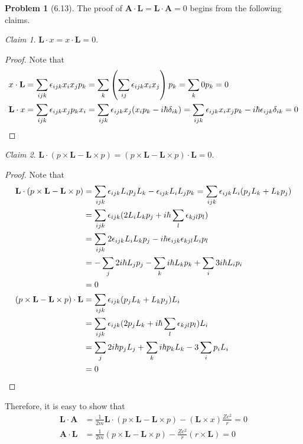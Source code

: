 \documentclass[twoside,11pt]{article}
\theoremstyle{definition}
\newtheorem{problem}{Problem}
\theoremstyle{remark}
\newtheorem*{claim}{Claim}
\begin{document}
\begin{problem}[6.13]
The proof of $\mathbf{A}\cdot\mathbf{L} = \mathbf{L}\cdot\mathbf{A}=0$
begins from the following claims.
\begin{claim}
    $\mathbf{L}\cdot x = x\cdot \mathbf{L} = 0$.
\end{claim}
\begin{proof}
    Note that
    \begin{align*}
        x\cdot\mathbf{L} &= \sum_{ijk}\epsilon_{ijk}x_ix_jp_k = \sum_k \left(\sum_{ij}\epsilon_{ijk}x_ix_j\right)p_k
        = \sum_k 0p_k = 0\\
        \mathbf{L}\cdot x &= \sum_{ijk}\epsilon_{ijk}x_jp_kx_i = 
        \sum_{ijk}\epsilon_{ijk}x_j(x_ip_k-i\hbar\delta_{ik}) =
        \sum_{ijk}\epsilon_{ijk} x_ix_jp_k-i\hbar\epsilon_{ijk}\delta_{ik} = 0
        \qedhere
    \end{align*}
\end{proof}
\begin{claim}
    $\mathbf{L}\cdot (p\times\mathbf{L} - \mathbf{L}\times p) = 
    (p\times \mathbf{L} - \mathbf{L}\times p)\cdot \mathbf{L} = 0$.
\end{claim}
\begin{proof}
    Note that
    \begin{align*}
        \mathbf{L}\cdot (p\times\mathbf{L} - \mathbf{L}\times p) &= 
        \sum_{ijk}\epsilon_{ijk}L_ip_jL_k - \epsilon_{ijk}L_iL_jp_k
        =\sum_{ijk}\epsilon_{ijk}L_i(p_jL_k + L_kp_j)\\
        &= \sum_{ijk}\epsilon_{ijk}(2L_iL_kp_j + i\hbar\sum_{l}\epsilon_{kjl}p_l)\\
        &= \sum_{ijk}2\epsilon_{ijk}L_iL_kp_j - i\hbar\epsilon_{ijk}\epsilon_{kjl}L_ip_l\\
        &= -\sum_j 2i\hbar L_jp_j - \sum_ki\hbar L_kp_k + \sum_i 3i\hbar L_ip_i\\
        &= 0\\
        (p\times\mathbf{L} - \mathbf{L}\times p)\cdot\mathbf{L} &=
        \sum_{ijk}\epsilon_{ijk}(p_jL_k+L_kp_j)L_i\\
        &= \sum_{ijk}\epsilon_{ijk}(2p_jL_k + i\hbar\sum_l\epsilon_{kjl}p_l)L_i\\
        &= \sum_j 2i\hbar p_j L_j + \sum_ki\hbar p_k L_k - 3\sum_i p_iL_i\\
        &= 0\qedhere
    \end{align*}
\end{proof}
Therefore, it is easy to show that
\begin{align*}
    \mathbf{L}\cdot\mathbf{A} &= \frac{1}{2m}\mathbf{L}\cdot(p\times\mathbf{L}
    -\mathbf{L}\times p) - (\mathbf{L}\times x)\frac{Ze^2}{r} = 0\\
    \mathbf{A}\cdot\mathbf{L} &= \frac{1}{2m}(p\times\mathbf{L}-\mathbf{L}\times p)
    - \frac{Ze^2}{r}(r\times\mathbf{L}) = 0
\end{align*}

\end{problem}
\end{document}
